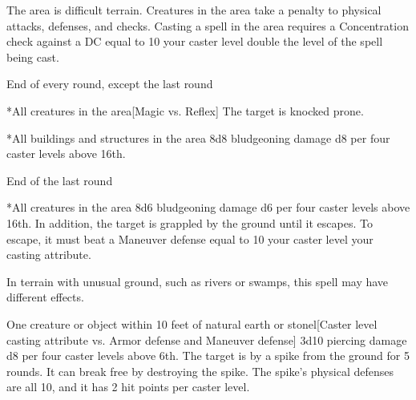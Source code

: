 \spellline
\spelleffect The area is difficult terrain. Creatures in the area take a  penalty to physical attacks, defenses, and checks. Casting a spell in the area requires a Concentration check against a DC equal to 10 \add your caster level \add double the level of the spell being cast.
\begin{spelltrigger}{End of every round, except the last round}
    \begin{spelltarget}*{All creatures in the area}[Magic vs. Reflex]
        \spellsuccess The target is knocked prone.
    \end{spelltarget}
    \begin{spelltarget}*{All buildings and structures in the area}
        \spelleffect 8d8 bludgeoning damage \add d8 per four caster levels above 16th.
    \end{spelltarget}
\end{spelltrigger}
\begin{spelltrigger}{End of the last round}
    \begin{spelltarget}*{All creatures in the area}
        \spelleffect 8d6 bludgeoning damage \add d6 per four caster levels above 16th. In addition, the target is grappled by the ground until it escapes. To escape, it must beat a Maneuver defense equal to 10 \add your caster level \add your casting attribute.
    \end{spelltarget}
\end{spelltrigger}
\spellnotes In terrain with unusual ground, such as rivers or swamps, this spell may have different effects.

\spellrng{\rngmed}
\begin{spelltarget}{One creature or object within 10 feet of natural earth or stone}l[Caster level \add casting attribute vs. Armor defense and Maneuver defense]
     3d10 piercing damage \add d8 per four caster levels above 6th.
     The target is \immobilized by a spike from the ground for 5 rounds. It can break free by destroying the spike. The spike's physical defenses are all 10, and it has 2 hit points per caster level.
\end{spelltarget}

